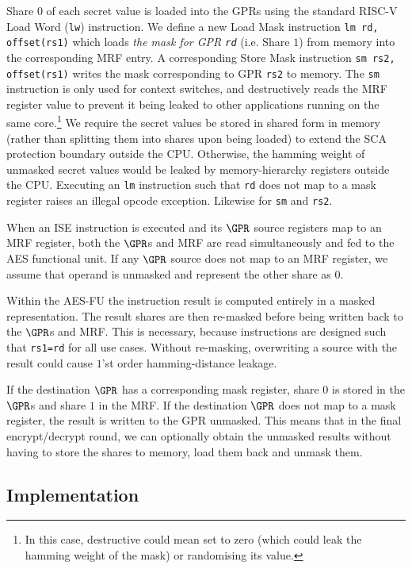 Share $0$ of each secret value is loaded into the GPRs using the
standard RISC-V Load Word ({\tt lw}) instruction.
We define a new Load Mask instruction {\tt lm rd, offset(rs1)} which
loads {\em the mask for GPR {\tt rd}}
(i.e. Share $1$)
from memory into the corresponding MRF entry.
A corresponding Store Mask instruction {\tt sm rs2, offset(rs1)} writes
the mask corresponding to GPR {\tt rs2} to memory.
The {\tt sm} instruction is only used for context switches, and
destructively reads the MRF register value to prevent it being
leaked to other applications running on the same core.\footnote{
    In this case, destructive could mean set to zero (which could
    leak the hamming weight of the mask) or randomising its value.}
We require the secret values be stored in shared form in memory
(rather than splitting them into shares upon being loaded)
to extend the SCA protection boundary outside the CPU.
Otherwise, the hamming weight of unmasked secret values would be
leaked by memory-hierarchy registers outside the CPU.
Executing an {\tt lm} instruction such that {\tt rd} does not map to
a mask register raises an illegal opcode exception.
Likewise for {\tt sm} and {\tt rs2}.

When an ISE instruction is executed and its $\GPR$ source
registers map to an MRF register, both the $\GPR$s and MRF are
read simultaneously and fed to the AES functional unit.
If any $\GPR$ source does not map to an MRF register, we assume that
operand is unmasked and represent the other share as $0$.

Within the AES-FU the instruction result is computed entirely in a
masked representation.
The result shares are then re-masked before being written back to the
$\GPR$s and MRF.
This is necessary, because  instructions are designed
such that {\tt rs1=rd} for all use cases.
Without re-masking, overwriting a source with the result could cause 
$1$'st order hamming-distance leakage.

If the destination $\GPR$ has a corresponding
mask register, share $0$ is stored in the $\GPR$s and share $1$ in the MRF.
If the destination $\GPR$ does not map to a mask register, the result is
written to the GPR unmasked.
This means that in the final encrypt/decrypt round, we can optionally obtain
the unmasked results without having to store the shares to memory,
load them back and unmask them.

\subsection{Implementation}


